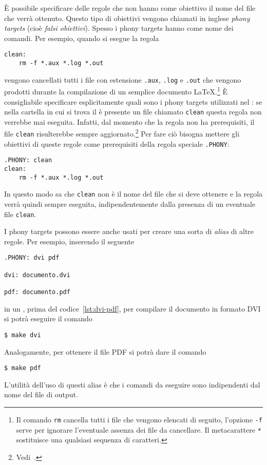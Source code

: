 È possibile specificare delle regole che non hanno come obiettivo il nome del
file che verrà ottenuto.  Questo tipo di obiettivi vengono chiamati in inglese
\emph{phony targets} (cioè \emph{falsi obiettivi}).  Spesso i phony targets
hanno come nome dei comandi. Per esempio, quando si esegue la regola
\begin{lstlisting}
clean:
	rm -f *.aux *.log *.out
\end{lstlisting}
vengono cancellati tutti i file con estensione \texttt{.aux}, \texttt{.log} e
\texttt{.out} che vengono prodotti durante la compilazione di un semplice
documento
\LaTeX.\footnote{Il comando \texttt{rm} cancella tutti i file che vengono
  elencati di seguito, l'opzione \texttt{-f} serve per ignorare l'eventuale
  assenza dei file da cancellare.  Il metacarattere \texttt{*} sostituisce una
  qualsiasi sequenza di caratteri.}
È consigliabile specificare esplicitamente quali sono i phony targets utilizzati
nel : se nella cartella in cui si trova il
 è presente un file chiamato \texttt{clean} questa regola
non verrebbe mai eseguita.  Infatti, dal momento che la regola non ha
prerequisiti, il file \texttt{clean} risulterebbe sempre
aggiornato.\footnote{Vedi~\cite[pagina 31]{gnu:make}.}  Per fare ciò bisogna
mettere gli obiettivi di queste regole come prerequisiti della regola speciale
\texttt{.PHONY}:
\begin{lstlisting}
.PHONY: clean
clean:
	rm -f *.aux *.log *.out
\end{lstlisting}
In questo modo  sa che \texttt{clean} non è il nome del file che
si deve ottenere e la regola verrà quindi sempre eseguita, indipendentemente
dalla presenza di un eventuale file \texttt{clean}.

I phony targets possono essere anche usati per creare una sorta di \emph{alias}
di altre regole.  Per esempio, inserendo il seguente
\begin{lstlisting}[caption={I prerequisiti della regola dell'obiettivo
\texttt{.PHONY} sono i nomi dei phony targets che vengono successivamente
specificati.},label=lst:phony]
.PHONY: dvi pdf

dvi: documento.dvi

pdf: documento.pdf
\end{lstlisting}
in un , prima del codice~\ref{lst:dvi-pdf}, per compilare il
documento in formato \textsc{DVI} si potrà eseguire il comando
\begin{verbatim}
$ make dvi
\end{verbatim}
Analogamente, per ottenere il file \textsc{PDF} si potrà dare il comando
\begin{verbatim}
$ make pdf
\end{verbatim}
L'utilità dell'uso di questi alias è che i comandi da eseguire sono indipendenti
dal nome del file di output.

